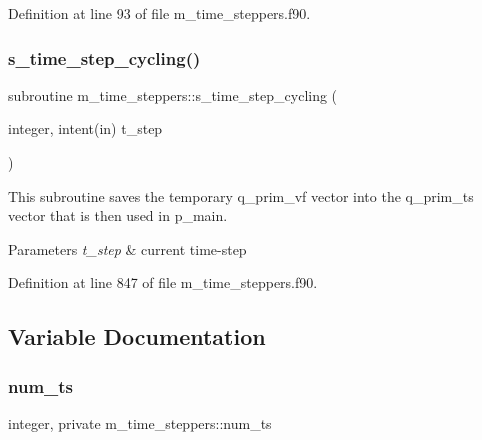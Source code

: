 Definition at line 93 of file m\+\_\+time\+\_\+steppers.\+f90.

\mbox{\label{namespacem__time__steppers_a575aa7f95bf96994f49d81d71d19c192}} 
\subsubsection{\texorpdfstring{s\+\_\+time\+\_\+step\+\_\+cycling()}{s\_time\_step\_cycling()}}
{\footnotesize\ttfamily subroutine m\+\_\+time\+\_\+steppers\+::s\+\_\+time\+\_\+step\+\_\+cycling (\begin{DoxyParamCaption}\item[{integer, intent(in)}]{t\+\_\+step }\end{DoxyParamCaption})}



This subroutine saves the temporary q\+\_\+prim\+\_\+vf vector into the q\+\_\+prim\+\_\+ts vector that is then used in p\+\_\+main. 


\begin{DoxyParams}{Parameters}
{\em t\+\_\+step} & current time-\/step \\
\hline
\end{DoxyParams}


Definition at line 847 of file m\+\_\+time\+\_\+steppers.\+f90.



\subsection{Variable Documentation}
\mbox{\label{namespacem__time__steppers_af1bbf3b693b9d269249a93dca5069b56}} 
\subsubsection{\texorpdfstring{num\+\_\+ts}{num\_ts}}
{\footnotesize\ttfamily integer, private m\+\_\+time\+\_\+steppers\+::num\+\_\+ts\hspace{0.3cm}{\ttfamily [private]}}




